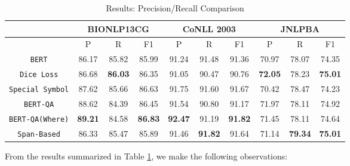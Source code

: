 \begin{table}[h!]
\centering
\begin{tabular}{|c|c|c|c|c|c|c|c|c|c|}\hline
     & \multicolumn{3}{c|}{\textbf{BIONLP13CG}} & \multicolumn{3}{c|}{\textbf{CoNLL 2003}} & \multicolumn{3}{c|}{\textbf{JNLPBA}}\\\hline
	 & P & R & F1 & P & R & F1 & P & R & F1\\\hline
	\texttt{BERT} & 86.17 & 85.82 & 85.99 & 91.24 & 91.48 & 91.36 & 70.97 & 78.07 & 74.35\\\hline
	\texttt{Dice Loss} & 86.68 & \textbf{86.03} & 86.35 & 91.05 & 90.47 & 90.76 & \textbf{72.05} & 78.23 & \textbf{75.01}\\\hline
	\texttt{Special Symbol} & 87.62 & 85.66 & 86.63 & 91.75 & 91.60 & 91.67 & 70.42 & 78.47 & 74.23\\\hline
	\texttt{BERT-QA} & 88.62 & 84.39 & 86.45 & 91.54 & 90.80 & 91.17 & 71.97 & 78.11 & 74.92\\\hline
	\texttt{BERT-QA(Where)} & \textbf{89.21} & 84.58 & \textbf{86.83} & \textbf{92.47} & 91.19 & \textbf{91.82} & 71.45 & 78.11 & 74.64\\\hline
	\texttt{Span-Based} & 86.33 & 85.47 & 85.89 & 91.46 & \textbf{91.82} & 91.64 & 71.14 & \textbf{79.34} & \textbf{75.01}\\\hline
	\end{tabular}
    \caption{Results: Precision/Recall Comparison}
    \label{tab:res_precision_recall}
\end{table}

From the results summarized in Table \ref{tab:res_precision_recall}, we make the following observations:

